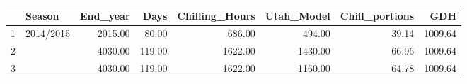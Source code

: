 \documentclass[11pt]{article}
\begin{document}
\begin{table}[ht]
\centering
\begin{tabular}{rlrrrrrr}
  \hline
 & Season & End\_year & Days & Chilling\_Hours & Utah\_Model & Chill\_portions & GDH \\ 
  \hline
1 & 2014/2015 & 2015.00 & 80.00 & 686.00 & 494.00 & 39.14 & 1009.64 \\ 
  2 &  & 4030.00 & 119.00 & 1622.00 & 1430.00 & 66.96 & 1009.64 \\ 
  3 &  & 4030.00 & 119.00 & 1622.00 & 1160.00 & 64.78 & 1009.64 \\ 
   \hline
\end{tabular}
\end{table}
\end{document}
